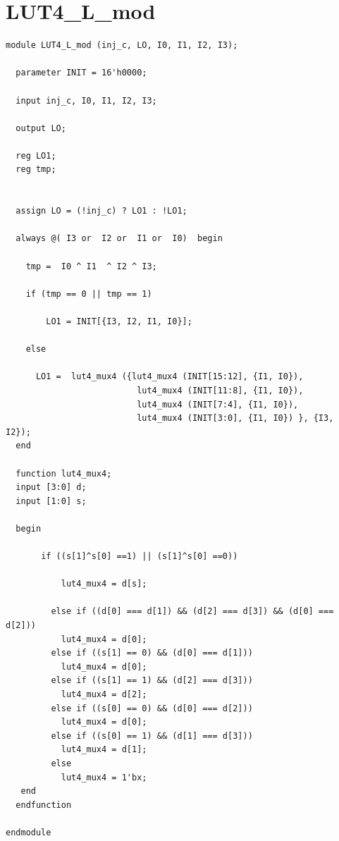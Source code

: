 \documentclass[a4paper,openright,12pt]{report}
\begin{document}
\section{LUT4\_L\_mod}
\begin{lstlisting}
module LUT4_L_mod (inj_c, LO, I0, I1, I2, I3);

  parameter INIT = 16'h0000;

  input inj_c, I0, I1, I2, I3;

  output LO;

  reg LO1;
  reg tmp;

  
  assign LO = (!inj_c) ? LO1 : !LO1;
  
  always @( I3 or  I2 or  I1 or  I0)  begin
 
    tmp =  I0 ^ I1  ^ I2 ^ I3;

    if (tmp == 0 || tmp == 1)

        LO1 = INIT[{I3, I2, I1, I0}];

    else 
    
      LO1 =  lut4_mux4 ({lut4_mux4 (INIT[15:12], {I1, I0}),
                          lut4_mux4 (INIT[11:8], {I1, I0}),
                          lut4_mux4 (INIT[7:4], {I1, I0}),
                          lut4_mux4 (INIT[3:0], {I1, I0}) }, {I3, I2});
  end

  function lut4_mux4;
  input [3:0] d;
  input [1:0] s;
   
  begin

       if ((s[1]^s[0] ==1) || (s[1]^s[0] ==0))
           
           lut4_mux4 = d[s];

         else if ((d[0] === d[1]) && (d[2] === d[3]) && (d[0] === d[2])) 
           lut4_mux4 = d[0];
         else if ((s[1] == 0) && (d[0] === d[1]))
           lut4_mux4 = d[0];
         else if ((s[1] == 1) && (d[2] === d[3])) 
           lut4_mux4 = d[2];
         else if ((s[0] == 0) && (d[0] === d[2])) 
           lut4_mux4 = d[0];
         else if ((s[0] == 1) && (d[1] === d[3]))
           lut4_mux4 = d[1];
         else
           lut4_mux4 = 1'bx;
   end
  endfunction

endmodule
\end{lstlisting}
\end{document}
